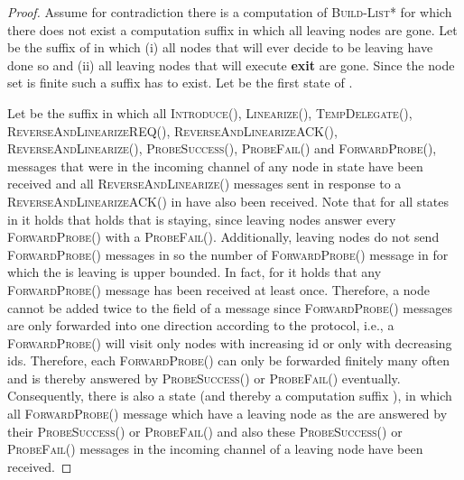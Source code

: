 \documentclass[a4paper,USenglish]{lipics}
\newcommand{\blpp}{\textsc{Build-List*}\xspace}
\newcommand{\linearize}[1]{\textsc{Linearize(\ensuremath{#1})}\xspace}
\newcommand{\introduce}[1]{\textsc{Introduce(\ensuremath{#1})}\xspace}
\newcommand{\tempdelegate}[1]{\textsc{TempDelegate(\ensuremath{#1})}\xspace}
\newcommand{\forwardprobe}[1]{\textsc{ForwardProbe(\ensuremath{#1})}\xspace}
\newcommand{\psuccess}[1]{\textsc{ProbeSuccess(\ensuremath{#1})}\xspace}
\newcommand{\pfail}[1]{\textsc{ProbeFail(\ensuremath{#1})}\xspace}
\newcommand{\revandlin}[1]{\textsc{ReverseAndLinearize(\ensuremath{#1})}\xspace} \newcommand{\revandlinREQ}[1]{\textsc{ReverseAndLinearizeREQ(#1)}\xspace}
\newcommand{\revandlinACK}[1]{\textsc{ReverseAndLinearizeACK(#1)}\xspace}
\begin{document}
 \begin{proof}
   Assume for contradiction there is a computation  of \blpp for which there does not exist a computation suffix in which all leaving nodes are gone.
   Let  be the suffix of  in which (i) all nodes that will ever decide to be leaving have done so and (ii) all leaving nodes that will execute \textbf{exit} are gone.
Since the node set is finite such a suffix has to exist.
   Let  be the first state of .

  Let  be the suffix in which all \introduce{}, \linearize{}, \tempdelegate{}, \revandlinREQ{}, \revandlinACK{}, \revandlin{}, \psuccess{}, \pfail{} and \forwardprobe{}, messages that were in the incoming channel of any node in state  have been received and all \revandlin{} messages sent in response to a \revandlinACK{} in  have also been received.
  Note that for all states in  it holds that holds that  is staying, since leaving nodes answer every \forwardprobe{} with a \pfail{}.
    Additionally, leaving nodes do not send \forwardprobe{} messages in  so the number of  \forwardprobe{} message in  for which the  is leaving is upper bounded.
  In fact, for  it holds that any \forwardprobe{} message has been received at least once.
  Therefore, a node cannot be added twice to the  field of a message since \forwardprobe{}messages are only forwarded into one direction according to the protocol, i.e., a \forwardprobe{} will visit only nodes with increasing id or only with decreasing ids.
  Therefore, each \forwardprobe{} can only be forwarded finitely many often and is thereby answered by \psuccess{} or \pfail{} eventually.
  Consequently, there is also a state (and thereby a computation suffix ), in which all \forwardprobe{} message which have a leaving node as the  are answered by their \psuccess{} or \pfail{} and also these \psuccess{} or \pfail{} messages in the incoming channel of a leaving node have been received. 


\end{proof}
\end{document}
